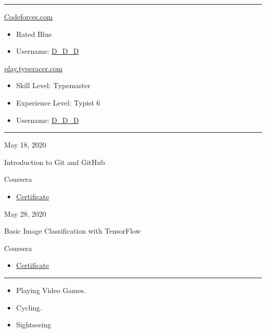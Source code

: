 \documentclass[a4paper,10pt]{article}
\newlength{\cvcolumngapwidth}
\newlength{\cvleftcolumnwidth}
\newlength{\cvrightcolumnwidth}
\newcommand{\cvsectionstyle}[1]{{\normalsize\cvsectionfont\textcolor{cvsectioncolor}{#1}}}
\newcommand{\cvtitlestyle}[1]{{\large\cvtitlefont\textcolor{cvtitlecolor}{#1}}}
\newcommand{\cvdurationstyle}[1]{{\small\cvdurationfont\textcolor{cvdurationcolor}{#1}}}
\newcommand{\cvheadingstyle}[1]{{\normalsize\cvheadingfont\textcolor{cvheadingcolor}{#1}}}
\newlength{\cvafteritemskipamount}
\newlength{\cvaftersectionskipamount}
\newlength{\cvbetweensectionandheadingextraskipamount}
\newlength{\cvaftertitleskipamount}
\newlength{\cvparskip}
\newcommand{\cvsection}[1]{
    \begin{minipage}[t]{\cvleftcolumnwidth}
        \raggedleft\cvsectionstyle{#1}
    \end{minipage}%
    \hspace{\cvcolumngapwidth}%
    \begin{minipage}[t]{\cvrightcolumnwidth}
        \textcolor{cvrulecolor}{\rule{\cvrightcolumnwidth}{0.3mm}}
    \end{minipage}

    \vspace{\cvaftersectionskipamount}
}
\newcommand{\cvitem}[2]{
    \begin{minipage}[t]{\cvleftcolumnwidth}
        \raggedleft #1
    \end{minipage}%
    \hspace{\cvcolumngapwidth}%
    \begin{minipage}[t]{\cvrightcolumnwidth}
        \setlength{\parskip}{\cvparskip} #2
    \end{minipage}

    \vspace{\cvafteritemskipamount}
}
\newcommand{\cvtitle}[1]{
    \cvtitlestyle{#1}

    \vspace{\cvaftertitleskipamount}
    \vspace{-\cvparskip}
}
\begin{document}
\cvsection{Extracurricular Activities}

\vspace{\cvbetweensectionandheadingextraskipamount}

\cvitem{
    \cvheadingstyle{\href{https://codeforces.com/profile/D_D_D}{Codeforces.com}}
}{
    \begin{itemize}[leftmargin=*]
    \item Rated Blue
    \item Username: \href{https://codeforces.com/profile/D_D_D}{D\_D\_D}
    \end{itemize}
}
\cvitem{
    \cvheadingstyle{\href{https://data.typeracer.com/pit/profile?user=d_d_d}{play.typeracer.com}}
}{
    \begin{itemize}[leftmargin=*]
    \item Skill Level: Typemaster
    \item Experience Level: Typist 6
    \item Username: \href{https://data.typeracer.com/pit/profile?user=d_d_d}{D\_D\_D}
    \end{itemize}
}

\cvsection{Certificates}

\cvitem{
    \cvdurationstyle{May 18, 2020}
}{
    \cvtitle{Introduction to Git and GitHub}

    Coursera

    \begin{itemize}[leftmargin=*]
        \item \href{https://www.coursera.org/account/accomplishments/verify/ZXTDJY9H39XV}{Certificate}
    \end{itemize}
}

\cvitem{
    \cvdurationstyle{ May 28, 2020}
}{
    \cvtitle{Basic Image Classification with TensorFlow}

    Coursera

    \begin{itemize}[leftmargin=*]
        \item \href{https://www.coursera.org/account/accomplishments/verify/3QMGVMNB93CM}{Certificate}
    \end{itemize}
}


\cvsection{Hobbies and Interest}

\vspace{\cvbetweensectionandheadingextraskipamount}

\cvitem{
    \cvheadingstyle{}
}{
    \begin{itemize}[leftmargin=*]
    \item Playing Video Games.
    \item Cycling.
    \item Sightseeing
    \end{itemize}
}
\end{document}
